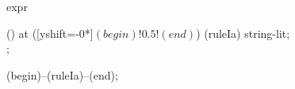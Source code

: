 \begin{syntax}{expr}
  
  \node[sequence] () at ([yshift=-0*\syntaxruledist]$(begin)!0.5!(end)$) {
    \node[nonterminal]    (ruleIa) {string-lit};
    \\
  };
  
  \draw[path] (begin)--(ruleIa)--(end);
\end{syntax}
%  
%  
%  
%  
%  
%  
%  
%  
%  
